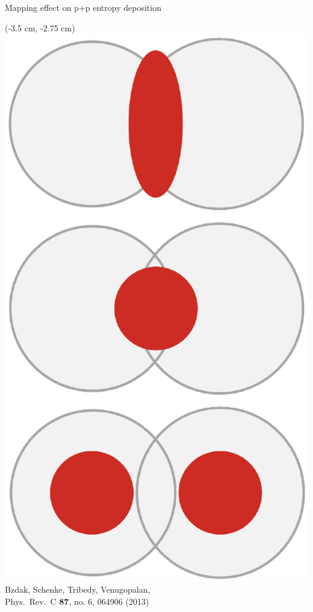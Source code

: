 \documentclass[svgnames]{beamer}
\begin{document}
\begin{frame}[label=ppoverlap]{Mapping effect on p+p entropy deposition}
  \begin{textblock*}{\linewidth}(-3.5 cm, -2.75 cm)
    \centering \includegraphics[scale=0.25]{bjorn-shapes} \\
    \vspace{0.1 in}
    \tiny Bzdak, Schenke, Tribedy, Venugopalan, \\
    Phys.\ Rev.\ C {\bf 87}, no. 6, 064906 (2013)
  \end{textblock*}
  

\end{frame}
\end{document}
